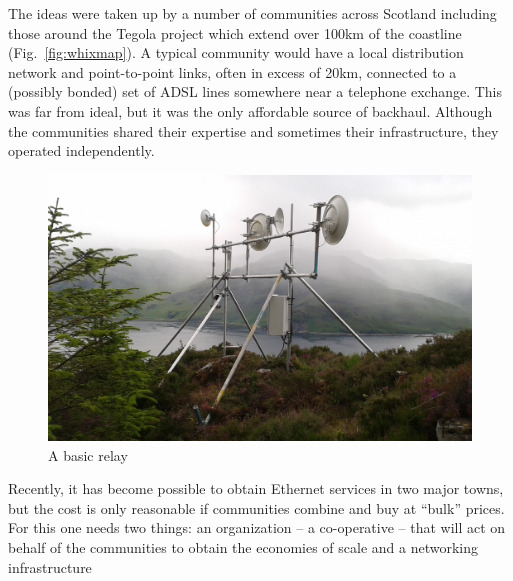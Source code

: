 The ideas were taken up by a number of communities across Scotland
including those around the Tegola project which extend over 100km of
the coastline  (Fig.~\ref{fig:whixmap}). A 
typical community would have a local distribution network and
point-to-point links, often in excess of 20km, connected to a
(possibly bonded) set of ADSL lines somewhere near a telephone
exchange. This was far from ideal, but it was the only affordable
source of backhaul. Although the communities shared their expertise
and sometimes their infrastructure, they operated independently.

\begin{figure}[h]
\centering
 \includegraphics[width=\columnwidth]{figs/mhialairigh-from-behind}
 \caption{A basic relay}
\label{fig:mhialairigh}
\end{figure}

Recently, it has become possible to obtain Ethernet services in two
major towns, but the cost is only reasonable if communities combine
and buy at ``bulk'' prices.  For this one needs two things: an
organization -- a co-operative -- that will act on behalf of the
communities to obtain the economies of scale and a networking
infrastructure

